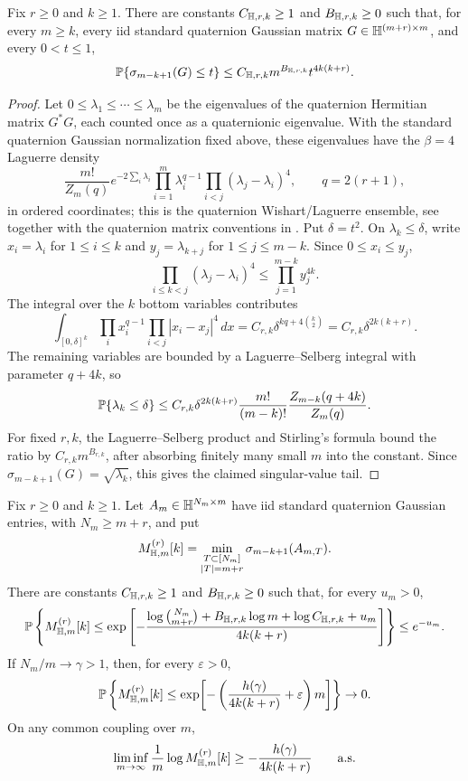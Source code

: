 \begin{lemma}\label{lem:quat-rect-kth-laguerre-tail}
Fix \(r\ge0\) and \(k\ge1\).  There are constants
\(C_{\mathbb{H},r,k}\ge1\) and \(B_{\mathbb{H},r,k}\ge0\) such that, for every \(m\ge k\),
every iid standard quaternion Gaussian matrix \(G\in\mathbb{H}^{(m+r)\times m}\), and
every \(0<t\le1\),
\[
  \mathbb{P}\{\sigma_{m-k+1}(G)\le t\}
  \le C_{\mathbb{H},r,k}m^{B_{\mathbb{H},r,k}}t^{4k(k+r)} .
\]
\end{lemma}

\begin{proof}
Let \(0\le\lambda_1\le\cdots\le\lambda_m\) be the eigenvalues of the quaternion
Hermitian matrix \(G^*G\), each counted once as a quaternionic eigenvalue.  With
the standard quaternion Gaussian normalization fixed above, these eigenvalues
have the \(\beta=4\) Laguerre density
\[
  \frac{m!}{Z_m(q)}
  e^{-2\sum_i\lambda_i}
  \prod_{i=1}^m \lambda_i^{q-1}
  \prod_{i<j}(\lambda_j-\lambda_i)^4,
  \qquad q=2(r+1),
\]
in ordered coordinates; this is the quaternion Wishart/Laguerre ensemble, see
\cite[Chs.~3--4]{Forrester2010} together with the quaternion matrix conventions
in \cite{Zhang1997Quaternions}.  Put \(\delta=t^2\).  On
\(\lambda_k\le\delta\), write \(x_i=\lambda_i\) for \(1\le i\le k\) and
\(y_j=\lambda_{k+j}\) for \(1\le j\le m-k\).  Since \(0\le x_i\le y_j\),
\[
  \prod_{i\le k<j}(\lambda_j-\lambda_i)^4
  \le \prod_{j=1}^{m-k}y_j^{4k}.
\]
The integral over the \(k\) bottom variables contributes
\[
  \int_{[0,\delta]^k}\prod_i x_i^{q-1}
       \prod_{i<j}|x_i-x_j|^4\,dx
  =
  C_{r,k}\delta^{kq+4\binom{k}{2}}
  =
  C_{r,k}\delta^{2k(k+r)}.
\]
The remaining variables are bounded by a Laguerre--Selberg integral with
parameter \(q+4k\), so
\[
  \mathbb{P}\{\lambda_k\le\delta\}
  \le
  C_{r,k}\delta^{2k(k+r)}
  \frac{m!}{(m-k)!}\frac{Z_{m-k}(q+4k)}{Z_m(q)} .
\]
For fixed \(r,k\), the Laguerre--Selberg product and Stirling's formula bound
the ratio by \(C_{r,k}m^{B_{r,k}}\), after absorbing finitely many small \(m\)
into the constant.  Since \(\sigma_{m-k+1}(G)=\sqrt{\lambda_k}\), this gives the
claimed singular-value tail.
\end{proof}

\begin{theorem}\label{thm:quat-fixed-excess-fixed-k-lower}
Fix \(r\ge0\) and \(k\ge1\).  Let \(A_m\in\mathbb{H}^{N_m\times m}\) have iid standard
quaternion Gaussian entries, with \(N_m\ge m+r\), and put
\[
  M_{\mathbb{H},m}^{(r)}[k]
  =
  \min_{\substack{T\subset[N_m]\\ |T|=m+r}}\sigma_{m-k+1}(A_{m,T}).
\]
There are constants \(C_{\mathbb{H},r,k}\ge1\) and \(B_{\mathbb{H},r,k}\ge0\) such that, for
every \(u_m>0\),
\[
  \mathbb{P}\left\{M_{\mathbb{H},m}^{(r)}[k]\le
  \exp\left[-\frac{\log\binom{N_m}{m+r}
    +B_{\mathbb{H},r,k}\log m+\log C_{\mathbb{H},r,k}+u_m}{4k(k+r)}\right]\right\}
  \le e^{-u_m}.
\]
If \(N_m/m\to\gamma>1\), then, for every \(\varepsilon>0\),
\[
  \mathbb{P}\left\{M_{\mathbb{H},m}^{(r)}[k]\le
  \exp\!\left[-\left(\frac{h(\gamma)}{4k(k+r)}+\varepsilon\right)m\right]\right\}
  \to0.
\]
On any common coupling over \(m\),
\[
  \liminf_{m\to\infty}\frac1m\log M_{\mathbb{H},m}^{(r)}[k]
  \ge -\frac{h(\gamma)}{4k(k+r)}
  \qquad\hbox{a.s.}
\]
\end{theorem}

